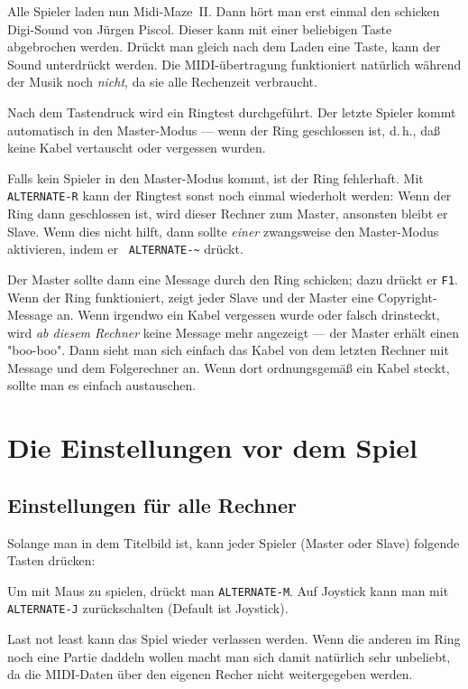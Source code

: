 \documentclass[12pt,twoside]{article}
\newcommand{\mmI}{{\sc Midi-Maze}}
\newcommand{\mm}{\mmI~{\sc II}}
\begin{document}
Alle Spieler laden nun \mm. Dann h\"ort man erst einmal den schicken 
Digi-Sound von J\"urgen Piscol. Dieser kann mit einer beliebigen Taste 
abgebrochen werden. Dr\"uckt man gleich nach dem Laden eine Taste, kann der 
Sound unterdr\"uckt werden. Die MIDI-\"ubertragung funktioniert nat\"urlich 
w\"ahrend der Musik noch {\em nicht\/}, da sie alle Rechenzeit verbraucht.


Nach dem Tastendruck wird ein Ringtest durchgef\"uhrt. Der letzte Spieler 
kommt automatisch in den Master-Modus --- wenn der Ring geschlossen ist, 
d.\,h., da\ss{} keine Kabel vertauscht oder vergessen wurden.


Falls kein Spieler in den Master-Modus kommt, ist der Ring fehlerhaft. Mit 
\verb|ALTERNATE-R| kann der Ringtest sonst noch einmal wiederholt werden: 
Wenn der Ring dann geschlossen ist, wird dieser Rechner zum Master, 
ansonsten bleibt er Slave. Wenn dies nicht hilft, dann sollte {\em einer\/} 
zwangsweise den Master-Modus aktivieren, indem er {\tt 
AL\-TER\-NATE}\verb|-~| dr\"uckt.


Der Master sollte dann eine Message durch den Ring schicken; dazu dr\"uckt 
er \verb|F1|. Wenn der Ring funktioniert, zeigt jeder Slave und der Master 
eine Copyright-Message an. Wenn irgendwo ein Kabel vergessen wurde oder 
falsch drinsteckt, wird {\em ab diesem Rechner\/} keine Message mehr 
angezeigt --- der Master erh\"alt einen "boo-boo". Dann sieht man sich 
einfach das Kabel von dem letzten Rechner mit Message und dem Folgerechner 
an. Wenn dort ordnungsgem\"a\ss{} ein Kabel steckt, sollte man es einfach 
austauschen.


\section{Die Einstellungen vor dem Spiel}


\subsection{Einstellungen f\"ur alle Rechner}


Solange man in dem Titelbild ist, kann jeder Spieler (Master oder Slave) 
folgende Tasten dr\"ucken:


Um mit Maus zu spielen, dr\"uckt man \verb|ALTERNATE-M|. Auf Joystick kann man 
mit \verb|ALTERNATE-J| zur\"uckschalten (Default ist Joystick).


Last not least kann das Spiel wieder verlassen werden. Wenn die anderen im 
Ring noch eine Partie daddeln wollen macht man sich damit nat\"urlich sehr 
unbeliebt, da die MIDI-Daten \"uber den eigenen Recher nicht weitergegeben 
werden.
\end{document}
